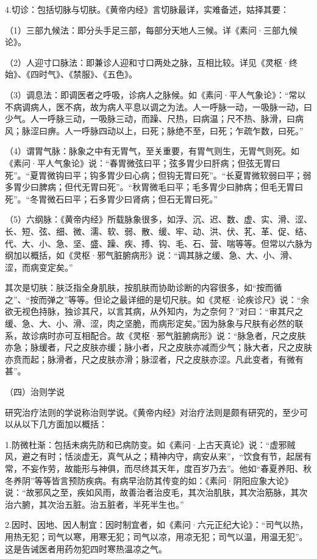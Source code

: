 \documentclass[a4paper,12pt,UTF8,twoside]{ctexbook}
\begin{document}
	4.切诊：包括切脉与切肤。《黄帝内经》言切脉最详，实难备述，姑择其要：
	
	（1）三部九候法：即分头手足三部，每部分天地人三候。详《素问·三部九候论》。
	
	（2）人迎寸口脉法：即兼诊人迎和寸口两处之脉，互相比较。详见《灵枢·终始》、《四时气》、《禁服》、《五色》。
	
	（3）调息法：即调医者之呼吸，诊病人之脉候。如《素问·平人气象论》：“常以不病调病人，医不病，故为病人平息以调之为法。人一呼脉一动，一吸脉一动，曰少气。人一呼脉三动，一吸脉三动，而躁、尺热，曰病温；尺不热、脉滑，曰病风；脉涩曰痹。人一呼脉四动以上，曰死；脉绝不至，曰死；乍疏乍数，曰死。”
	
	（4）谓胃气脉：脉象之中有无胃气，至关重要，有胃气则生，无胃气则死。如《素问·平人气象论》说：“春胃微弦曰平；弦多胃少曰肝病；但弦无胃曰死”。“夏胃微钩曰平；钩多胃少曰心病；但钩无胃曰死”。“长夏胃微软弱曰平；弱多胃少曰脾病；但代无胃曰死”。“秋胃微毛曰平；毛多胃少曰肺病；但毛无胃曰死”。“冬胃微石曰平；石多胃少曰肾病；但石无胃曰死。”
	
	（5）六纲脉：《黄帝内经》所载脉象很多，如浮、沉、迟、数、虚、实、滑、涩、长、短、弦、细、微、濡、软、弱、散、缓、牢、动、洪、伏、芤、革、促、结、代、大、小、急、坚、盛、躁、疾、搏、钩、毛、石、营、喘等等。但常以六脉为纲加以概括，如《灵枢·邪气脏腑病形》说：“调其脉之缓、急、大、小、滑、涩，而病变定矣。”
	
	其次是切肤：肤泛指全身肌肤，按肌肤而协助诊断的内容很多，如“按而循之”、“按而弹之”等等。但论之最详细的是切尺肤。如《灵枢·论疾诊尺》说：“余欲无视色持脉，独诊其尺，以言其病，从外知内，为之奈何？”对曰：“审其尺之缓、急、大、小、滑、涩，肉之坚脆，而病形定矣。”因为脉象与尺肤有必然的联系，故诊病时亦可互相配合。故《灵枢·邪气脏腑病形》说：“脉急者，尺之皮肤亦急；脉缓者，尺之皮肤亦缓；脉小者，尺之皮肤亦减而少气；脉大者，尺之皮肤亦贲而起；脉滑者，尺之皮肤亦滑；脉涩者，尺之皮肤亦涩。凡此变者，有微有甚”。
	
	（四）治则学说
	
	研究治疗法则的学说称治则学说。《黄帝内经》对治疗法则是颇有研究的，至少可以从以下几方面加以概括：
	
	1.防微杜渐：包括未病先防和已病防变。如《素问·上古天真论》说：“虚邪贼风，避之有时；恬淡虚无，真气从之；精神内守，病安从来”，“饮食有节，起居有常，不妄作劳，故能形与神俱，而尽终其天年，度百岁乃去”。他如“春夏养阳、秋冬养阴”等等皆言预防疾病。有病早治防其传变的如：《素问·阴阳应象大论》说：“故邪风之至，疾如风雨，故善治者治皮毛，其次治肌肤，其次治筋脉，其次治六腑，其次治五脏。治五脏者，半死半生也。”
	
	2.因时、因地、因人制宜：因时制宜者，如《素问·六元正纪大论》：“司气以热，用热无犯；司气以寒，用寒无犯；司气以凉，用凉无犯；司气以温，用温无犯”。这是告诫医者用药勿犯四时寒热温凉之气。
	
\end{document}
